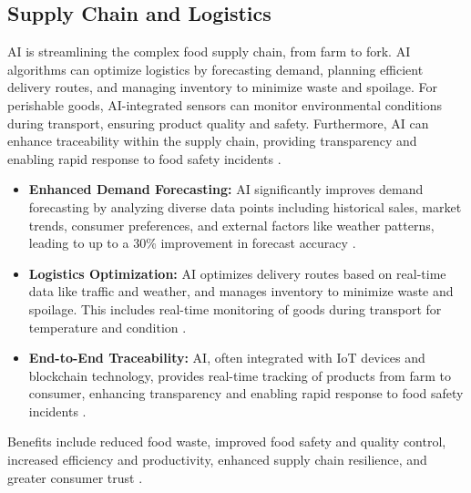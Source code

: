 \subsection{Supply Chain and Logistics}
AI is streamlining the complex food supply chain, from farm to fork. AI algorithms can optimize logistics by forecasting demand, planning efficient delivery routes, and managing inventory to minimize waste and spoilage. For perishable goods, AI-integrated sensors can monitor environmental conditions during transport, ensuring product quality and safety. Furthermore, AI can enhance traceability within the supply chain, providing transparency and enabling rapid response to food safety incidents \cite{singh2024artificial}.
\begin{itemize}
    \item \textbf{Enhanced Demand Forecasting:} AI significantly improves demand forecasting by analyzing diverse data points including historical sales, market trends, consumer preferences, and external factors like weather patterns, leading to up to a 30\% improvement in forecast accuracy \cite{ASCM_SupplyChain, PromptCloud_SupplyChain}.
    \item \textbf{Logistics Optimization:} AI optimizes delivery routes based on real-time data like traffic and weather, and manages inventory to minimize waste and spoilage. This includes real-time monitoring of goods during transport for temperature and condition \cite{FoodLogistics_SupplyChain, FirstShift_SupplyChain}.
    \item \textbf{End-to-End Traceability:} AI, often integrated with IoT devices and blockchain technology, provides real-time tracking of products from farm to consumer, enhancing transparency and enabling rapid response to food safety incidents \cite{ResearchGate_SupplyChain, DigiComply_SupplyChain}.
\end{itemize}
Benefits include reduced food waste, improved food safety and quality control, increased efficiency and productivity, enhanced supply chain resilience, and greater consumer trust \cite{FoodCloudPlus_SupplyChain, OrderGrid_SupplyChain}.

